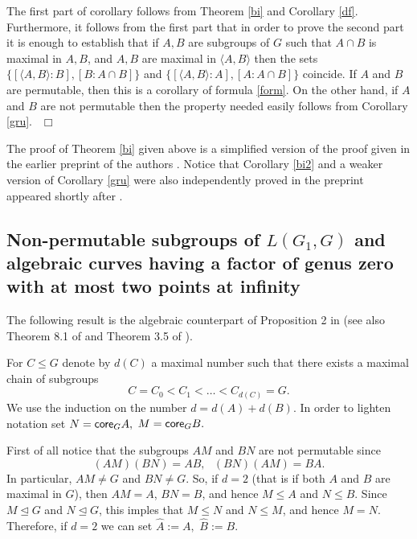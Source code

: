 \documentclass{amsart}
\begin{document}
{}
The first part of corollary follows from
Theorem \ref{bi} and Corollary \ref{df}. Furthermore, it follows
from the first part that in order to prove the second part
it is enough to establish that if $A,B$ are subgroups of $G$ such that
$A\cap B$ is maximal in $A,B$, and $A,B$ are maximal in ${\langle{{A,B}}\rangle}$
then the sets $\{[{\langle{{A,B}}\rangle}:B],[B:A\cap B]\}$ and
$\{[{\langle{{A,B}}\rangle}:A],[A:A\cap B]\}$ coincide.
If $A$ and $B$ are permutable, then this is a corollary of
formula \eqref{form}.
On the other hand, if $A$ and $B$ are not permutable then the property
needed easily follows from Corollary \ref{gru}.
{$\ \ \Box$ \vskip 0.2cm}

\vskip 0.2cm
 The proof of Theorem \ref{bi} given above is a simplified
version of the proof given in the earlier preprint of the authors \cite{mp1}. Notice that Corollary \ref{bi2} and a weaker version of Corollary \ref{gru} were also independently proved in the
preprint \cite{kz} appeared shortly after \cite{mp1}.

\subsection{Non-permutable subgroups of $L(G_1,G)$ and algebraic curves having a factor
of genus zero with at most two points at infinity}
The following result is the algebraic counterpart of Proposition 2 in \cite{f2} (see also Theorem 8.1 of \cite{bilu} and Theorem 3.5 of \cite{pak}).

{}
For $C\leq G$ denote by $d(C)$ a maximal number such that there
exists a maximal chain of subgroups
$$C=C_0< C_1<\dots < C_{d(C)}=G.$$
We use the induction on the number $d=d(A)+d(B)$. In order to lighten notation set $N={{\sf core}}_GA,$ $M={{\sf core}}_GB.$

First of all notice that the subgroups $AM$ and $BN$ are not permutable
since $$(AM)(BN)=AB, \ \ \ (BN)(AM)=BA.$$
In particular,
$AM\neq G$ and $BN\neq G$. So, if $d=2$ (that is if both $A$ and $B$ are maximal in $G$),
then $AM = A$, $BN=B$, and hence
$M\leq A$ and $N\leq B$. Since $M{\trianglelefteq} G$ and $N{\trianglelefteq} G$, this imples that
$M\leq N $ and $N\leq M$,
and hence $M=N.$
Therefore, if $d=2$ we can set $\hat{A}:=A,$ $\hat{B}:=B$.
\end{document}
